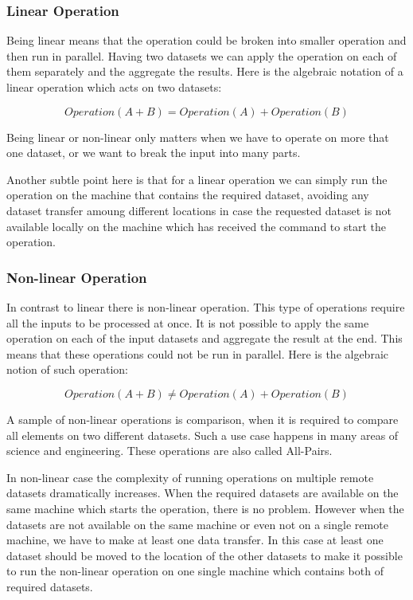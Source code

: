 \subsubsection{Linear Operation}
Being linear means that the operation
could be broken into smaller operation and then run in parallel. Having two datasets we can apply the
operation on each of them separately and the aggregate the results. Here is the algebraic notation
of a linear operation which acts on two datasets:

\[ Operation(A + B) = Operation(A) + Operation(B) \]

Being linear or non-linear only matters when we have to operate on more that one dataset, or we want to
break the input into many parts.

Another subtle point here is that for a linear operation we can simply run the operation on the machine that
contains the required dataset, avoiding any dataset transfer amoung different locations in case the requested
dataset is not available locally on the machine which has received the command to start the operation.

\subsubsection{Non-linear Operation}
In contrast to linear there is non-linear operation. This type of operations require all the inputs to be processed
at once. It is not possible to apply the same operation on each of the input datasets and aggregate the result at the
end. This means that these operations could not be run in parallel.
Here is the algebraic notion of such operation:

\[ Operation(A + B) \neq Operation(A) + Operation(B) \]

A sample of non-linear operations is comparison, when it is required to compare all elements on two different datasets. 
Such a use case happens in many areas of science and engineering. These operations are also called All-Pairs. \cite{moretti08}

In non-linear case the complexity of running operations on multiple remote datasets dramatically increases. When the required
datasets are available on the same machine which starts the operation, there is no problem. However when the datasets are not
available on the same machine or even not on a single remote machine, we have to make at least one data transfer. In this 
case at least one dataset should be moved to the location of the other datasets to make it possible to run the non-linear
operation on one single machine which contains both of required datasets.

